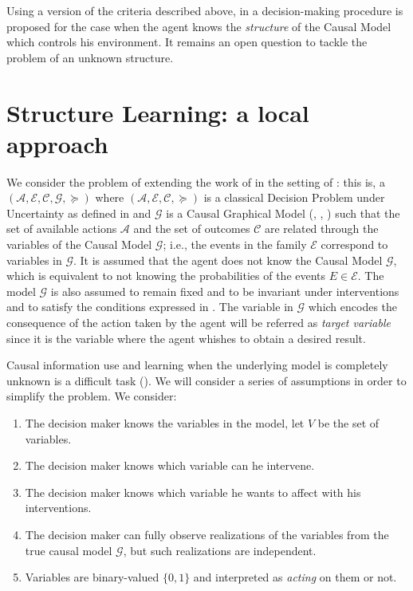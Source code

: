 \documentclass[letterpaper]{article}
\begin{document}
Using a version of the criteria described above, in \cite{gonzalez2018playing} a decision-making procedure is proposed for the case when the agent knows the \textit{structure} of the Causal Model which controls his environment. It remains an open question to tackle the problem of an unknown structure. 

\section{Structure Learning: a local approach}
We consider the problem of extending the work of \cite{gonzalez2018playing} in the setting of \cite{2019arXiv190202279G}: this is, a $(\mathcal{A}, \mathcal{E}, \mathcal{C}, \mathcal{G}, \succeq)$ where $(\mathcal{A}, \mathcal{E}, \mathcal{C}, \succeq)$ is a classical Decision Problem under Uncertainty as defined in \cite{bernardo2000bayesian} and $\mathcal{G}$ is a Causal Graphical Model (\cite{spirtes2000causation}, \cite{koller2009probabilistic}, \cite{sucar2015probabilistic}) such that the set of available actions $\mathcal{A}$ and the set of outcomes $\mathcal{C}$ are related through the variables of the Causal Model $\mathcal{G}$; i.e., the events in the family $\mathcal{E}$ correspond to variables in $\mathcal{G}$. It is assumed that the agent does not know the Causal Model $\mathcal{G}$, which is equivalent to not knowing the probabilities of the events $E \in \mathcal{E}$. The model $\mathcal{G}$ is also assumed to remain fixed and to be invariant under interventions \cite{woodward2005making} and to satisfy the conditions expressed in \cite{spirtes2000causation}. The variable in $\mathcal{G}$ which encodes the consequence of the action taken by the agent will be referred as \textit{target variable} since it is the variable where the agent whishes to obtain a desired result. 

Causal information use and learning when the underlying model is completely unknown is a difficult task (\cite{lattimoreNIPS2016}). We will consider a series of assumptions in order to simplify the problem. We consider:
\begin{enumerate}
\item The decision maker knows the variables in the model, let $V$ be the set of variables.
\item The decision maker knows which variable can he intervene.
\item The decision maker knows which variable he wants to affect with his interventions. 
\item The decision maker can fully observe realizations of the variables from the true causal model $\mathcal{G}$, but such realizations are independent.
\item Variables are binary-valued $\{0,1 \}$ and interpreted as \textit{acting} on them or not. 
\end{enumerate}
\end{document}
